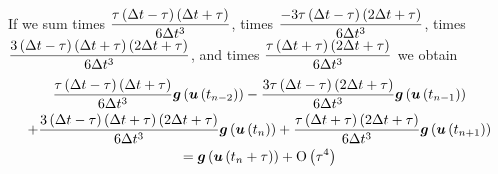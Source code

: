 If we sum  times
$\dfrac{\tau\left( \Delta t - \tau \right)\left( \Delta t + \tau \right)}{6\Delta t^{3}}$,
 times
$\dfrac{-3\tau\left( \Delta t - \tau \right)\left( 2\Delta t + \tau \right)}{6\Delta
  t^{3}}$,  times
$\dfrac{3\left( \Delta t - \tau \right)\left( \Delta t + \tau \right)\left( 2\Delta t +
    \tau \right)}{6\Delta t^{3}}$, and 
times $\dfrac{\tau\left( \Delta t + \tau \right)\left( 2\Delta t + \tau \right)}{6\Delta
  t^{3}}$ we obtain
\begin{multline}
  \dfrac{\tau\left( \Delta t - \tau \right)\left( \Delta t + \tau \right)}{6\Delta
    t^{3}}  \boldsymbol{g} \left(   \boldsymbol{u} \left( t_{n-2} \right)  \right) 
  -\dfrac{3\tau\left( \Delta t - \tau \right)\left( 2\Delta t + \tau \right)}{6\Delta
    t^{3}}  \boldsymbol{g} \left(   \boldsymbol{u} \left( t_{n-1} \right)  \right)  \\
  +\dfrac{3\left( \Delta t - \tau \right)\left( \Delta t + \tau \right)\left( 2\Delta t + \tau \right)}{6\Delta
    t^{3}}  \boldsymbol{g} \left(   \boldsymbol{u} \left( t_{n} \right)  \right) 
  +\dfrac{\tau\left( \Delta t + \tau \right)\left( 2\Delta t + \tau \right)}{6\Delta
    t^{3}}  \boldsymbol{g} \left(   \boldsymbol{u} \left( t_{n+1} \right)  \right)  \\
  =  \boldsymbol{g} \left(   \boldsymbol{u} \left( t_{n}+\tau \right)  \right) +
   \mathrm{O}\left( \tau^{4} \right) 
\end{multline}

